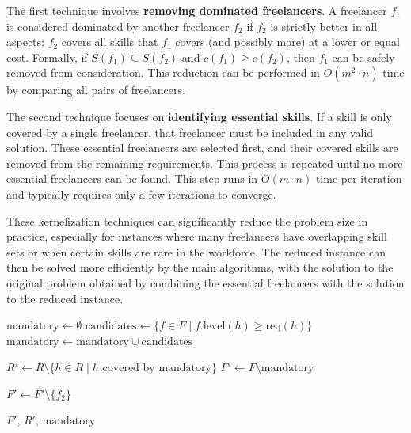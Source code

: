 \documentclass[12pt,a4paper]{article}
\begin{document}
The first technique involves \textbf{removing dominated freelancers}. A freelancer $f_1$ is considered dominated by another freelancer $f_2$ if $f_2$ is strictly better in all aspects: $f_2$ covers all skills that $f_1$ covers (and possibly more) at a lower or equal cost. Formally, if $S(f_1) \subseteq S(f_2)$ and $c(f_1) \geq c(f_2)$, then $f_1$ can be safely removed from consideration. This reduction can be performed in $O(m^2 \cdot n)$ time by comparing all pairs of freelancers.

The second technique focuses on \textbf{identifying essential skills}. If a skill is only covered by a single freelancer, that freelancer must be included in any valid solution. These essential freelancers are selected first, and their covered skills are removed from the remaining requirements. This process is repeated until no more essential freelancers can be found. This step runs in $O(m \cdot n)$ time per iteration and typically requires only a few iterations to converge.

These kernelization techniques can significantly reduce the problem size in practice, especially for instances where many freelancers have overlapping skill sets or when certain skills are rare in the workforce. The reduced instance can then be solved more efficiently by the main algorithms, with the solution to the original problem obtained by combining the essential freelancers with the solution to the reduced instance.

\begin{algorithm}[H]
	\caption{Preprocessing via Kernelization}
	\label{alg:kernelization}
	\begin{algorithmic}[1]
		\State $\text{mandatory} \gets \emptyset$
		\State $\text{candidates} \gets \{f \in F \mid f.\text{level}(h) \geq \text{req}(h)\}$
		\State $\text{mandatory} \gets \text{mandatory} \cup \text{candidates}$
		\EndIf
		\EndFor
		
		\State $R' \gets R \setminus \{h \in R \mid h \text{ covered by } \text{mandatory}\}$
		\State $F' \gets F \setminus \text{mandatory}$
		
		 
		\State $F' \gets F' \setminus \{f_2\}$
		\EndIf
		\EndFor
		\EndFor
		
		\State \Return $F'$, $R'$, $\text{mandatory}$
		\EndFunction
	\end{algorithmic}
\end{algorithm}
\end{document}
